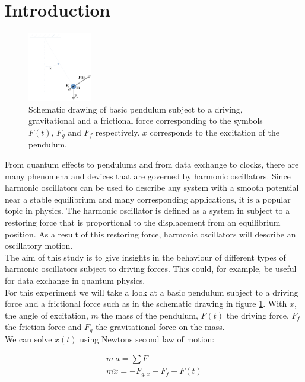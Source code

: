 \section{Introduction}
\begin{figure}
	\includegraphics[width=0.25\textwidth]{figures/pendulum.png}
	\caption{Schematic drawing of basic pendulum subject to a driving, gravitational and a frictional force corresponding to the symbols $F(t)$, $F_g$ and $F_f$ respectively. $x$ corresponds to the excitation of the pendulum.}
	\label{fig_pendulum}
\end{figure}

From quantum effects to pendulums and from data exchange to clocks, there are many phenomena and devices that are governed by harmonic oscillators. Since harmonic oscillators can be used to describe any system with a smooth potential near a stable equilibrium and many corresponding applications, it is a popular topic in physics. The harmonic oscillator is defined as a system in subject to a restoring force that is proportional to the displacement from an equilibrium position. As a result of this restoring force, harmonic oscillators will describe an oscillatory motion. \\
The aim of this study is to give insights in the behaviour of different types of harmonic oscillators subject to driving forces. This could, for example, be useful for data exchange in quantum physics. \\
For this experiment we will take a look at a basic pendulum subject to a driving force and a frictional force such as in the schematic drawing in figure \ref{fig_pendulum}. With $x$, the angle of excitation, $m$ the mass of the pendulum, $F(t)$ the driving force, $F_f$ the friction force and $F_g$ the gravitational force on the mass. \\
We can solve $x(t)$ using Newtons second law of motion:

\begin{align*}
	m \: a = \sum F  \\
	m \ddot{x} = - F_{g,x} - F_f + F(t)
\end{align*}

